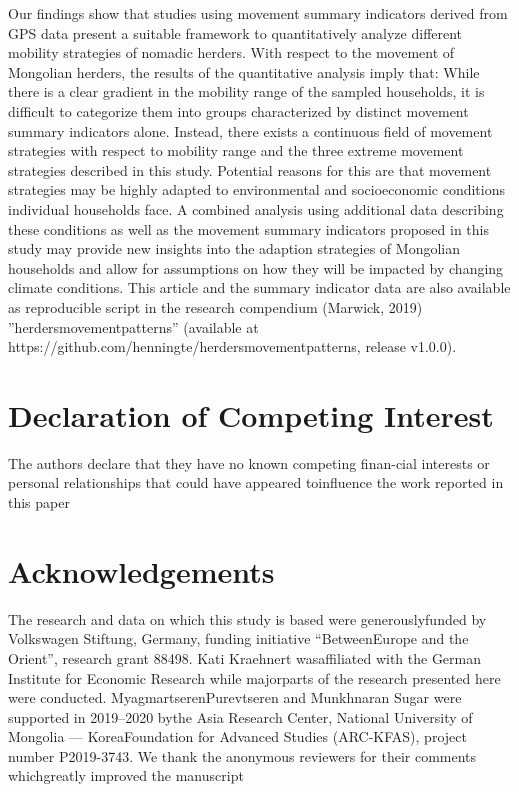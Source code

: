 \documentclass[]{elsarticle} %
\begin{document}
Our findings show that studies using movement summary indicators derived
from GPS data present a suitable framework to quantitatively analyze
different mobility strategies of nomadic herders. With respect to the
movement of Mongolian herders, the results of the quantitative analysis
imply that: While there is a clear gradient in the mobility range of the
sampled households, it is difficult to categorize them into groups
characterized by distinct movement summary indicators alone. Instead,
there exists a continuous field of movement strategies with respect to
mobility range and the three extreme movement strategies described in
this study. Potential reasons for this are that movement strategies may
be highly adapted to environmental and socioeconomic conditions
individual households face. A combined analysis using additional data
describing these conditions as well as the movement summary indicators
proposed in this study may provide new insights into the adaption
strategies of Mongolian households and allow for assumptions on how they
will be impacted by changing climate conditions. This article and the
summary indicator data are also available as reproducible script in the
research compendium (Marwick, 2019) ''herdersmovementpatterns''
(available at https://github.com/henningte/herdersmovementpatterns,
release v1.0.0).

\hypertarget{declaration-of-competing-interest}{%
\section{Declaration of Competing
Interest}\label{declaration-of-competing-interest}}

The authors declare that they have no known competing finan-cial
interests or personal relationships that could have appeared toinfluence
the work reported in this paper

\hypertarget{acknowledgements}{%
\section{Acknowledgements}\label{acknowledgements}}

The research and data on which this study is based were generouslyfunded
by Volkswagen Stiftung, Germany, funding initiative ``BetweenEurope and
the Orient'', research grant 88498. Kati Kraehnert wasaffiliated with
the German Institute for Economic Research while majorparts of the
research presented here were conducted. MyagmartserenPurevtseren and
Munkhnaran Sugar were supported in 2019--2020 bythe Asia Research
Center, National University of Mongolia --- KoreaFoundation for Advanced
Studies (ARC-KFAS), project number P2019-3743. We thank the anonymous
reviewers for their comments whichgreatly improved the manuscript
\end{document}
